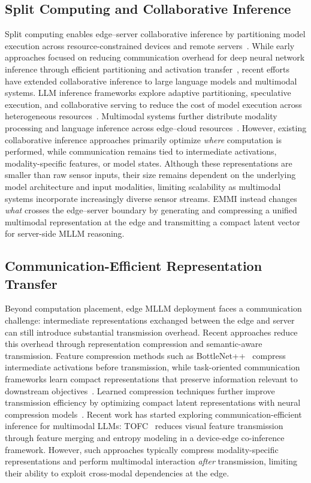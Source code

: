 \documentclass[10pt,twocolumn]{article}
\begin{document}
\subsection{Split Computing and Collaborative Inference}

Split computing enables edge--server collaborative inference by partitioning
model execution across resource-constrained devices and remote
servers~\cite{split1,split2}. While early approaches focused on reducing
communication overhead for deep neural network inference through efficient
partitioning and activation transfer~\cite{split3}, recent efforts have
extended collaborative inference to large language models and multimodal
systems. LLM inference frameworks explore adaptive partitioning, speculative
execution, and collaborative serving to reduce the cost of model execution
across heterogeneous resources~\cite{park2025specedge,zhang2025edgeshard,younesi2025splitwise}.
Multimodal systems further distribute modality processing and language
inference across edge--cloud resources~\cite{multimodalsplit1}. However,
existing collaborative inference approaches primarily optimize \emph{where}
computation is performed, while communication remains tied to intermediate
activations, modality-specific features, or model states. Although these
representations are smaller than raw sensor inputs, their size remains
dependent on the underlying model architecture and input modalities,
limiting scalability as multimodal systems incorporate increasingly diverse
sensor streams. EMMI instead changes \emph{what} crosses the edge--server
boundary by generating and compressing a unified multimodal representation
at the edge and transmitting a compact latent vector for server-side MLLM
reasoning.

\subsection{Communication-Efficient Representation Transfer}

Beyond computation placement, edge MLLM deployment faces a communication
challenge: intermediate representations exchanged between the edge and
server can still introduce substantial transmission overhead. Recent
approaches reduce this overhead through representation compression and
semantic-aware transmission. Feature compression methods such as
BottleNet++~\cite{bottlenet} compress intermediate activations before
transmission, while task-oriented communication frameworks learn compact
representations that preserve information relevant to downstream
objectives~\cite{taskcomm1,taskcomm2}. Learned compression techniques
further improve transmission efficiency by optimizing compact latent
representations with neural compression models~\cite{neurcomp1}. Recent
work has started exploring communication-efficient inference for multimodal
LLMs: TOFC~\cite{yuan2025task} reduces visual feature transmission through
feature merging and entropy modeling in a device-edge co-inference framework.
However, such approaches typically compress modality-specific representations
and perform multimodal interaction \emph{after} transmission, limiting their
ability to exploit cross-modal dependencies at the edge.
\end{document}
